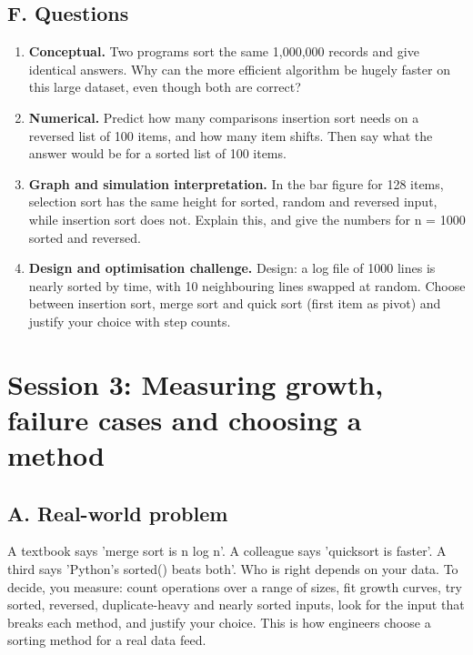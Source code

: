 \documentclass[11pt,a4paper]{article}
\begin{document}
\subsection*{F. Questions}
\begin{enumerate}[nosep]
\item \textbf{Conceptual.} Two programs sort the same 1,000,000 records and give identical answers. Why can the more efficient algorithm be hugely faster on this large dataset, even though both are correct?
\item \textbf{Numerical.} Predict how many comparisons insertion sort needs on a reversed list of 100 items, and how many item shifts. Then say what the answer would be for a sorted list of 100 items.
\item \textbf{Graph and simulation interpretation.} In the bar figure for 128 items, selection sort has the same height for sorted, random and reversed input, while insertion sort does not. Explain this, and give the numbers for n = 1000 sorted and reversed.
\item \textbf{Design and optimisation challenge.} Design: a log file of 1000 lines is nearly sorted by time, with 10 neighbouring lines swapped at random. Choose between insertion sort, merge sort and quick sort (first item as pivot) and justify your choice with step counts.
\end{enumerate}

\section{Session 3: Measuring growth, failure cases and choosing a method}

\subsection*{A. Real-world problem}
A textbook says 'merge sort is n log n'. A colleague says 'quicksort is faster'. A third says 'Python's sorted() beats both'. Who is right depends on your data. To decide, you measure: count operations over a range of sizes, fit growth curves, try sorted, reversed, duplicate-heavy and nearly sorted inputs, look for the input that breaks each method, and justify your choice. This is how engineers choose a sorting method for a real data feed.
\end{document}
